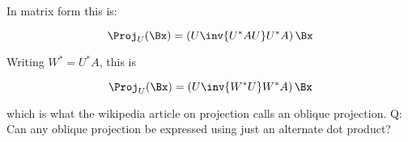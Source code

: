 \documentclass{article}      %
\begin{document}
In matrix form this is:

\begin{equation}
\Proj_U(\Bx) = \left(U \inv{U^* A U} U^* A\right) \Bx
\end{equation}

Writing $W^* = U^* A$, this is

\begin{equation*}
\Proj_U(\Bx) = \left(U \inv{W^* U} W^* A\right) \Bx
\end{equation*}

which is what the wikipedia article on projection calls an oblique projection.  Q: Can any oblique projection be expressed using just an alternate dot product?
\end{document}
